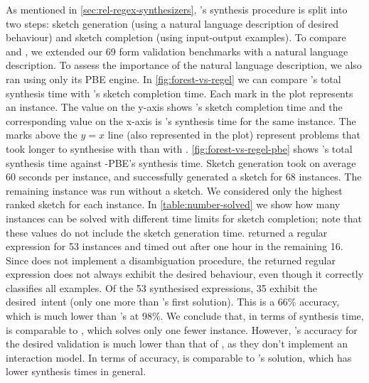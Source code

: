 

As mentioned in \autoref{sec:rel-regex-synthesizers}, \Regel's synthesis procedure is split into two steps: sketch generation (using a natural language description of desired behaviour) and sketch completion (using input-output examples).
%
To compare \Regel and \Forest{}, we extended our 69 form validation benchmarks with a natural language description.
To assess the importance of the natural language description, we also ran \Regel using only its PBE engine. %
%
In \autoref{fig:forest-vs-regel} we can compare \Forest's total synthesis time with \Regel's sketch completion time. Each mark in the plot represents an instance. The value on the y-axis shows \Regel's sketch completion time and the corresponding value on the x-axis is \Forest's synthesis time for the same instance. The marks above the \(y = x\) line (also represented in the plot) represent problems that took longer to synthesise with \Regel than with \Forest.
\autoref{fig:forest-vs-regel-pbe} shows \Forest's total synthesis time against \Regel-PBE's synthesis time.
Sketch generation took on average 60 seconds per instance, and successfully generated a sketch for 68 instances. The remaining instance was run without a sketch.
We considered only the highest ranked sketch for each instance.
In \autoref{table:number-solved} we show how many instances can be solved with different time limits for sketch completion; note that these values do not include the sketch generation time.
%
\Regel{} returned a regular expression for 53 instances and timed out after one hour in the remaining 16.
Since \Regel does not implement a disambiguation procedure, the returned regular expression does not always exhibit the desired behaviour, even though it correctly classifies all examples.
Of the 53 synthesised expressions, 35 exhibit the desired~intent (only one more than \Forest's first solution).
This is a 66\% accuracy, which is much lower than \Forest's at 98\%. 
We conclude that, in terms of synthesis time, \Regel is comparable to \Forest, which solves only one fewer instance. However, \Regel's accuracy for the desired validation is much lower than that of \Forest, as they don't implement an interaction model. In terms of accuracy, \Regel is comparable to \Forest's  solution, which has lower synthesis times in general.

